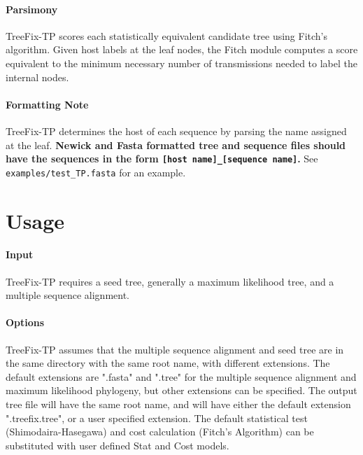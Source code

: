 \documentclass[11pt]{article}
\begin{document}
\paragraph{Parsimony}
TreeFix-TP scores each statistically equivalent candidate tree using Fitch's algorithm.
Given host labels at the leaf nodes, the Fitch module computes a score equivalent to the
minimum necessary number of transmissions needed to label the internal nodes.

\paragraph{Formatting Note} TreeFix-TP determines the host of each sequence by parsing the name assigned at the leaf. \textbf{Newick and Fasta formatted tree and sequence files should have the sequences in the form \texttt{[host name]\_[sequence name]}.} See \texttt{examples/test\_TP.fasta} for an example.

\section{Usage}

\paragraph{Input}
TreeFix-TP requires a seed tree, generally a maximum likelihood tree, and a multiple sequence alignment.

\paragraph{Options}
TreeFix-TP assumes that the multiple sequence alignment and seed tree are in the same directory with the same root name, with different extensions. The default extensions are ".fasta" and ".tree" for the multiple sequence alignment and maximum likelihood phylogeny, but other extensions can be specified. The output tree file will have the same root name, and will have either the default extension ".treefix.tree", or a user specified extension. The default statistical test (Shimodaira-Hasegawa) and cost calculation (Fitch's Algorithm) can be substituted with user defined Stat and Cost models.
\\
\end{document}
